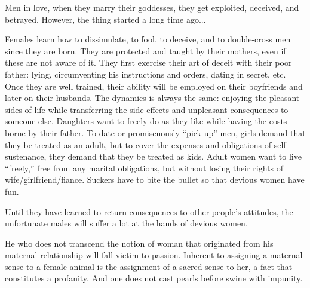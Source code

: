 \par Men in love, when they marry their goddesses, they get exploited, deceived, and betrayed. However, the thing started a long time ago...

\par Females learn how to dissimulate, to fool, to deceive, and to double-cross men since they are born. They are protected and taught by their mothers, even if these are not aware of it. They first exercise their art of deceit with their poor father: lying, circumventing his instructions and orders, dating in secret, etc. Once they are well trained, their ability will be employed on their boyfriends and later on their husbands. The dynamics is always the same: enjoying the pleasant sides of life while transferring the side effects and unpleasant consequences to someone else. Daughters want to freely do as they like while having the costs borne by their father. To date or promiscuously \enquote{pick up} men, girls demand that they be treated as an adult, but to cover the expenses and obligations of self-sustenance, they demand that they be treated as kids. Adult women want to live \enquote{freely,} free from any marital obligations, but without losing their rights of wife/girlfriend/fiance. Suckers have to bite the bullet so that devious women have fun.

\par Until they have learned to return consequences to other people's attitudes, the unfortunate males will suffer a lot at the hands of devious women.

\par He who does not transcend the notion of woman that originated from his maternal relationship will fall victim to passion. Inherent to assigning a maternal sense to a female animal is the assignment of a sacred sense to her, a fact that constitutes a profanity. And one does not cast pearls before swine with impunity.